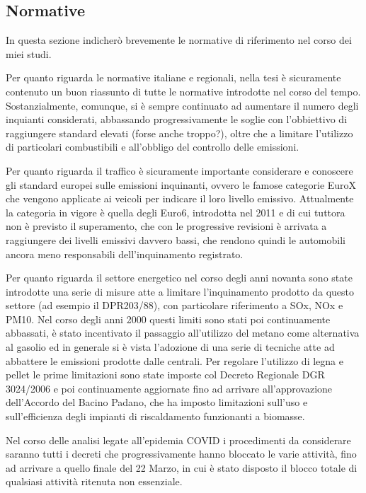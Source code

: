 \documentclass{article}
\begin{document}
\subsection{Normative}
\label{subsec:normative}
In questa sezione indicherò brevemente le normative di riferimento nel corso dei miei studi.

Per quanto riguarda le normative italiane e regionali, nella tesi\cite{scolari2017evoluzione} è sicuramente contenuto un buon riassunto di tutte le normative introdotte nel corso del tempo. Sostanzialmente, comunque, si è sempre continuato ad aumentare il numero degli inquianti considerati, abbassando progressivamente le soglie con l'obbiettivo di raggiungere standard elevati (forse anche troppo?), oltre che a limitare l'utilizzo di particolari combustibili e all'obbligo del controllo delle emissioni. 

Per quanto riguarda il traffico è sicuramente importante considerare e conoscere gli standard europei sulle emissioni inquinanti, ovvero le famose categorie EuroX che vengono applicate ai veicoli per indicare il loro livello emissivo. Attualmente la categoria in vigore è quella degli Euro6, introdotta nel 2011 e di cui tuttora non è previsto il superamento, che con le progressive revisioni è arrivata a raggiungere dei livelli emissivi davvero bassi, che rendono quindi le automobili ancora meno responsabili dell'inquinamento registrato. 

Per quanto riguarda il settore energetico nel corso degli anni novanta sono state introdotte una serie di misure atte a limitare l'inquinamento prodotto da questo settore (ad esempio il DPR203/88), con particolare riferimento a SOx, NOx e PM10. Nel corso degli anni 2000 questi limiti sono stati poi continuamente abbassati, è stato incentivato il passaggio all'utilizzo del metano come alternativa al gasolio ed in generale si è vista l'adozione di una serie di tecniche atte ad abbattere le emissioni prodotte dalle centrali. 
Per regolare l'utilizzo di legna e pellet le prime limitazioni sono state imposte col Decreto Regionale DGR 3024/2006 e poi continuamente aggiornate fino ad arrivare all'approvazione dell'Accordo del Bacino Padano, che ha imposto limitazioni sull'uso e sull'efficienza degli impianti di riscaldamento funzionanti a biomasse.

Nel corso delle analisi legate all'epidemia COVID i procedimenti da considerare saranno tutti i decreti che progressivamente hanno bloccato le varie attività, fino ad arrivare a quello finale del 22 Marzo, in cui è stato disposto il blocco totale di qualsiasi attività ritenuta non essenziale.
\end{document}
